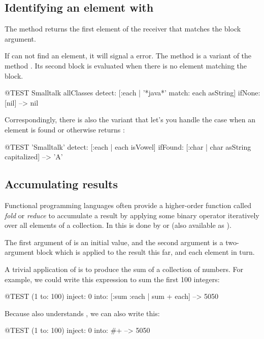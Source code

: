 \documentclass[a4paper,10pt,twoside]{book}
\begin{document}
\subsection{Identifying an element with }
The method  returns the first element of the receiver that matches the block argument.


If  can not find an element, it will signal a  error.
The method  is a variant of the method .
Its second block is evaluated when there is no element matching the block.

\begin{code}{@TEST}
Smalltalk allClasses detect: [:each | '*java*' match: each asString] ifNone: [nil] --> nil
\end{code}

Correspondingly, there is also the variant  that let's you handle the case when an element is found or otherwise returns :

\begin{code}{@TEST}
'Smalltalk' detect: [:each | each isVowel] ifFound: [:char | char asString capitalized] --> 'A'
\end{code}

\subsection{Accumulating results}
Functional programming languages often provide a higher-order function called \emph{fold} or \emph{reduce} to accumulate a result by applying some binary operator iteratively over all elements of a collection.
In \sq this is done by  or  (also available as ).

The first argument of  is an initial value, and the second argument is a two-argument block which is applied to the result this far, and each element in turn.

A trivial application of  is to produce the sum of a collection of numbers.
For example, we could write this expression to sum the first 100 integers:
\begin{code}{@TEST}
(1 to: 100) inject: 0 into: [:sum :each | sum + each] --> 5050
\end{code}
\noindent
Because  also understands , we can also write this:
\begin{code}{@TEST}
(1 to: 100) inject: 0 into: #+ --> 5050
\end{code}
\end{document}
